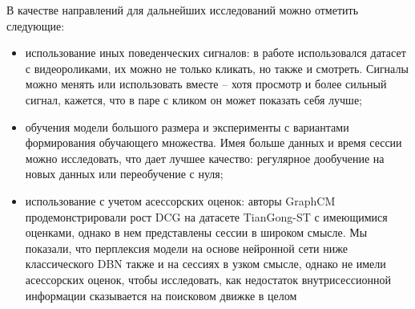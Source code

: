 \documentclass[diploma]{nanolab2015}
\begin{document}
В качестве направлений для дальнейших исследований можно отметить следующие:
\begin{itemize}
    \item использование иных поведенческих сигналов: в работе использовался датасет с видеороликами, их можно не только кликать, но также и смотреть. Сигналы можно менять или использовать вместе -- хотя просмотр и более сильный сигнал, кажется, что в паре с кликом он может показать себя лучше;
    \item обучения модели большого размера и эксперименты с вариантами формирования обучающего множества. Имея больше данных и время сессии можно исследовать, что дает лучшее качество: регулярное дообучение на новых данных или переобучение с нуля;
    \item использование с учетом асессорских оценок: авторы GraphCM продемонстрировали рост DCG на датасете TianGong-ST \cite{TianGong} с имеющимися оценками, однако в нем представлены сессии в широком смысле. Мы показали, что перплексия модели на основе нейронной сети ниже классического DBN также и на сессиях в узком смысле, однако не имели асессорских оценок, чтобы исследовать, как недостаток внутрисессионной информации сказывается на поисковом движке в целом
\end{itemize}
\end{document}
